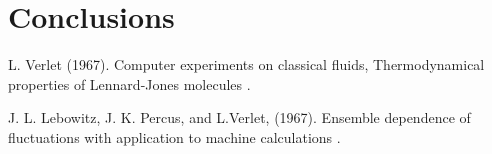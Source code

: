 \documentclass[twoside]{article}
\begin{document}
	
\section{Conclusions}
\lipsum[4]

%	
%
%


\begin{thebibliography}{1}
	L.   Verlet  (1967). 
	\newblock Computer  experiments   on   classical   fluids, 
	\newblock Thermodynamical properties of Lennard-Jones molecules
	.
	
	J. L. Lebowitz, J. K. Percus, and L.Verlet, (1967).
	\newblock Ensemble dependence of fluctuations with application
	to machine calculations
	.
\end{thebibliography}
	
\end{document}
